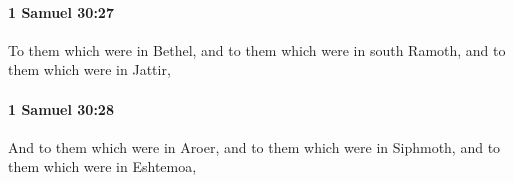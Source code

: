 		\paragraph{1 Samuel 30:27} %
			\label{1SAMUEL-30-27}

			To them which were in Bethel, and to them which were in south Ramoth, and to them which were in Jattir,


		\paragraph{1 Samuel 30:28} %
			\label{1SAMUEL-30-28}

			And to them which were in Aroer, and to them which were in Siphmoth, and to them which were in Eshtemoa,


